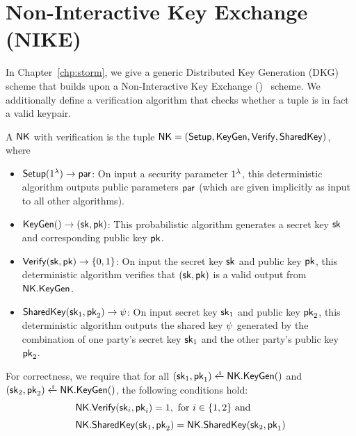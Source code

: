 \section{Non-Interactive Key Exchange (NIKE)}
\label{enike}

In Chapter~\ref{chp:storm},
we give a generic Distributed Key Generation (DKG) scheme that builds upon a Non-Interactive Key Exchange (\ENIKE)~\cite{Bernstein06,CashKS08,FreireHKP13} scheme.
We additionally define a verification algorithm that checks whether a tuple is in fact a valid keypair.


\begin{definition} \label{defn:enike}
  A  $\mathsf{NK}$ with verification is the tuple
  $\mathsf{NK} = (\mathsf{Setup},\mathsf{KeyGen}, \mathsf{Verify}, \mathsf{SharedKey})$, where

\begin{itemize}
    \item $\mathsf{Setup}(1^\lambda) \rightarrow \mathsf{par}$:
    On input a security parameter $1^\lambda$,
    this deterministic algorithm outputs public parameters $\mathsf{par}$ (which are given implicitly as input to all other algorithms).
  \item $\mathsf{KeyGen}() \rightarrow (\mathsf{sk}, \mathsf{pk})$:
    This probabilistic algorithm generates a secret key $\mathsf{sk}$ and corresponding public key $\mathsf{pk}$.
  \item $\mathsf{Verify}(\mathsf{sk}, \mathsf{pk}) \rightarrow \{ 0, 1\}$:
    On input the secret key $\mathsf{sk}$ and public key $\mathsf{pk}$,
    this deterministic algorithm verifies that $(\mathsf{sk},\mathsf{pk})$ is a valid output from $\mathsf{NK}.\mathsf{KeyGen}$.
  \item $\mathsf{SharedKey}(\mathsf{sk}_1, \mathsf{pk}_2) \rightarrow \psi$:
    On input secret key $\mathsf{sk}_1$ and public key $\mathsf{pk}_2$,
    this deterministic algorithm outputs the shared key $\psi$ generated by the combination of one party's secret key $\mathsf{sk}_1$ and the other party's public key $\mathsf{pk}_2$.
\end{itemize}
\end{definition}

For correctness, we require that for all
$(\SK_1, \PK_1) \rgets \enike.\keygen()$ and $(\SK_2, \PK_2) \rgets \enike.\keygen()$,
the following conditions hold:
\begin{align*}
  & \mathsf{NK}.\mathsf{Verify}(\mathsf{sk}_i, \mathsf{pk}_i) = 1, \text{ for } i \in \{1,2 \} \text{ and} \\[1mm]
  & \mathsf{NK}.\mathsf{SharedKey}(\mathsf{sk}_1, \mathsf{pk}_2) = \mathsf{NK}.\mathsf{SharedKey}(\mathsf{sk}_2, \mathsf{pk}_1)
\end{align*}

